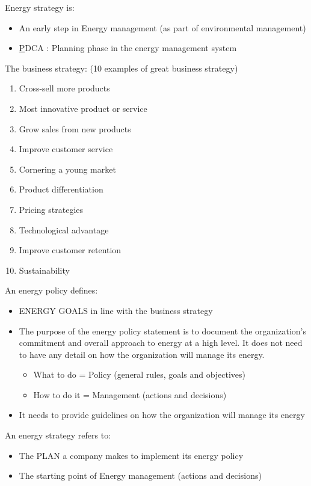 \documentclass[12pt]{article}
\begin{document}
Energy strategy is:\begin{itemize}
    \item An early step in Energy management (as part of environmental
    management) 
    \item \underline{P}DCA : Planning phase in the energy management system
\end{itemize}
The business strategy: (10 examples of great business strategy)\begin{enumerate}
    \item Cross-sell more products 
    \item Most innovative product or service 
    \item Grow sales from new products 
    \item Improve customer service 
    \item Cornering a young market 
    \item Product differentiation
    \item Pricing strategies
    \item Technological advantage
    \item Improve customer retention
    \item Sustainability
\end{enumerate}
An energy policy defines:\begin{itemize}
    \item ENERGY GOALS in line with the business strategy
    \item The purpose of the energy policy statement is to document the organization’s
    commitment and overall approach to energy at a high level. It does not need to have any detail on how the organization will manage its energy.\begin{itemize}
        \item What to do = Policy (general rules, goals and objectives) 
        \item How to do it = Management (actions and decisions)
    \end{itemize}
    \item It needs to provide guidelines on how the organization will manage its energy
\end{itemize}
An energy strategy refers to:\begin{itemize}
    \item The PLAN a company makes to implement its energy policy 
    \item The starting point of Energy management (actions and decisions)
\end{itemize}
\end{document}
